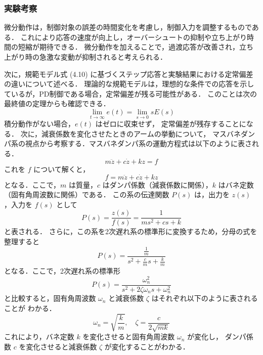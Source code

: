 \subsubsection{実験考察}
微分動作は，制御対象の誤差の時間変化を考慮し，制御入力を調整するものである．
これにより応答の速度が向上し，オーバーシュートの抑制や立ち上がり時間の短縮が期待できる．
微分動作を加えることで，過渡応答が改善され，立ち上がり時の急激な変動が抑制されると考えられる．

次に，規範モデル式 (4.10) に基づくステップ応答と実験結果における定常偏差の違いについて述べる．
理論的な規範モデルは，理想的な条件での応答を示しているが，PD制御である場合，定常偏差が残る可能性がある．
このことは次の最終値の定理からも確認できる．
\[
  \lim_{t \to \infty} e(t) = \lim_{s \to 0} s E(s)
\]
積分動作がない場合，\( e(t) \) はゼロに収束せず，
定常偏差が残存することになる．
次に，減衰係数を変化させたときのアームの挙動について，
マスバネダンパ系の視点から考察する．マスバネダンパ系の運動方程式は以下のように表される．
\[
  m \ddot{z} + c \dot{z} + k z = f
\]
これを \( f \) について解くと，
\[
  f = m \ddot{z} + c \dot{z} + k z
\]
となる．ここで，\( m \) は質量，\( c \) はダンパ係数（減衰係数に関係），\( k \) はバネ定数
（固有角周波数に関係）である．
この系の伝達関数 \( P(s) \) は，出力を \( z(s) \) ，入力を \( f(s) \) として
\[
  P(s) = \frac{z(s)}{f(s)} = \frac{1}{m s^2 + c s + k}
\]
と表される．
さらに，この系を2次遅れ系の標準形に変換するため，分母の式を整理すると
\[
  P(s) = \frac{\frac{1}{m}}{s^2 + \frac{c}{m} s + \frac{k}{m}}
\]
となる．ここで，2次遅れ系の標準形
\[
  P(s) = \frac{\omega_n^2}{s^2 + 2 \zeta \omega_n s + \omega_n^2}
\]
と比較すると，固有角周波数 \( \omega_n \) と減衰係数 \( \zeta \) はそれぞれ以下のように表されることが
わかる．
\[
  \omega_n = \sqrt{\frac{k}{m}}, \quad \zeta = \frac{c}{2 \sqrt{m k}}
\]
これにより，バネ定数 \( k \) を変化させると固有角周波数 \( \omega_n \) が変化し，
ダンパ係数 \( c \) を変化させると減衰係数 \( \zeta \) が変化することがわかる．


